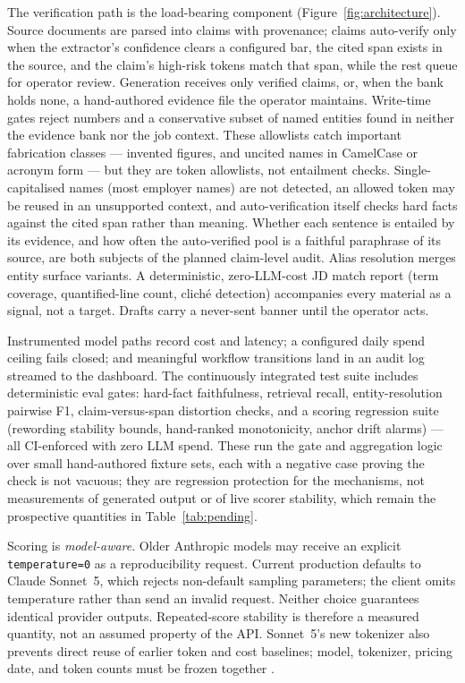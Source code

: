 \documentclass[11pt]{article}
\begin{document}
The verification path is the load-bearing component (Figure~\ref{fig:architecture}).
Source documents are parsed into claims with provenance; claims auto-verify
only when the extractor's confidence clears a configured bar, the cited span
exists in the source, and the claim's high-risk tokens match that span, while
the rest queue for operator review. Generation receives only verified claims,
or, when the bank holds none, a hand-authored evidence file the operator
maintains. Write-time gates reject numbers and a conservative subset of
named entities found in neither the evidence bank nor the job context. These
allowlists catch important fabrication classes --- invented figures, and
uncited names in CamelCase or acronym form --- but they are token allowlists,
not entailment checks. Single-capitalised names (most employer names) are not
detected, an allowed token may be reused in an unsupported context, and
auto-verification itself checks hard facts against the cited span rather than
meaning. Whether each sentence is entailed by its evidence, and how often the
auto-verified pool is a faithful paraphrase of its source, are both subjects of
the planned claim-level audit. Alias resolution merges entity surface variants. A deterministic,
zero-LLM-cost JD match report (term coverage, quantified-line count, clich\'e
detection) accompanies every material as a signal, not a target. Drafts carry
a never-sent banner until the operator acts.

Instrumented model paths record cost and latency; a configured daily spend
ceiling fails closed; and meaningful workflow transitions land in an
audit log streamed to the dashboard. The continuously integrated test suite
includes deterministic eval gates: hard-fact faithfulness, retrieval recall,
entity-resolution pairwise F1, claim-versus-span distortion checks, and a
scoring regression suite (rewording stability bounds, hand-ranked monotonicity,
anchor drift alarms) --- all CI-enforced with zero LLM spend. These run the
gate and aggregation logic over small hand-authored fixture sets, each with a
negative case proving the check is not vacuous; they are regression protection
for the mechanisms, not measurements of generated output or of live scorer
stability, which remain the prospective quantities in
Table~\ref{tab:pending}.

Scoring is \emph{model-aware}. Older Anthropic models may receive an explicit
\texttt{temperature=0} as a reproducibility request. Current production
defaults to Claude Sonnet~5, which rejects non-default sampling parameters;
the client omits temperature rather than send an invalid request. Neither
choice guarantees identical provider outputs. Repeated-score stability is
therefore a measured quantity, not an assumed property of the API. Sonnet~5's
new tokenizer also prevents direct reuse of earlier token and cost baselines;
model, tokenizer, pricing date, and token counts must be frozen together
\citep{anthropic2026sonnet5}.
\end{document}
